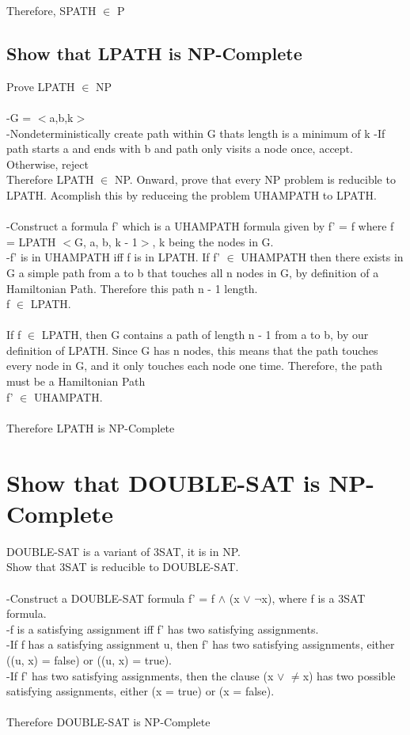 \documentclass[10pt,a4paper]{article}
\begin{document}
Therefore, SPATH $\in$ P

\subsection{Show that LPATH is NP-Complete}
Prove LPATH $\in$ NP\\
\\
-G = $<$a,b,k$>$\\
-Nondeterministically create path within G thats length is a minimum of k
-If path starts a and ends with b and path only visits a node once, accept. Otherwise, reject
\\
Therefore LPATH $\in$ NP. Onward, prove that every NP problem is reducible to LPATH. Acomplish this by
reduceing the problem UHAMPATH to LPATH.\\
\\
-Construct a formula f' which is a UHAMPATH formula given by f' = f where f =
LPATH $<$G, a, b, k - 1$>$, k being the nodes in G.\\
-f' is in UHAMPATH iff f is in LPATH.
If f' $\in$ UHAMPATH then there exists in G a simple path from a to b that touches all n nodes
in G, by definition of a Hamiltonian Path. Therefore this path n - 1 length.\\
f $\in$ LPATH.\\
\\
If f $\in$ LPATH, then G contains a path of length n - 1 from a to b, by our definition of LPATH.
Since G has n nodes, this means that the path touches every node in G, and it only touches
each node one time. Therefore, the path must be a Hamiltonian Path\\
f' $\in$ UHAMPATH.\\
\\
Therefore LPATH is NP-Complete

\section{Show that DOUBLE-SAT is NP-Complete}
DOUBLE-SAT is a variant of 3SAT, it is in NP.\\
Show that 3SAT is reducible to DOUBLE-SAT.\\
\\
-Construct a DOUBLE-SAT formula f' = f $\wedge$ (x $\vee$ $\neg$x), where f is a 3SAT formula.\\
-f is a satisfying assignment iff f' has two satisfying assignments.\\
-If f has a satisfying assignment u, then f' has two satisfying assignments, either ((u, x) =
false) or ((u, x) = true).\\
-If f' has two satisfying assignments, then the clause (x $\vee$ $\neq$x) has two possible satisfying
assignments, either (x = true) or (x = false).
\\\\
Therefore DOUBLE-SAT is NP-Complete
\end{document}
